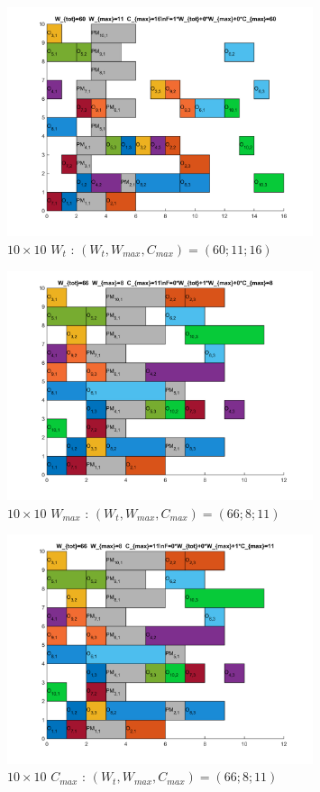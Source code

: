 \documentclass[10pt,a4paper]{scrartcl}
\begin{document}
\begin{figure}
  \centering
  \includegraphics[width=0.8\textwidth]{img/results10x10_Wtot.png}
  \caption{$10 \times 10$ $W_{t}$ : $(W_t, W_{max}, C_{max}) = (60; 11; 16)$}
\end{figure}
\begin{figure}
  \centering
  \includegraphics[width=0.8\textwidth]{img/results10x10_Wmax.png}
  \caption{$10 \times 10$ $W_{max}$ : $(W_t, W_{max}, C_{max}) = (66; 8; 11)$}
\end{figure}
\begin{figure}
  \centering
  \includegraphics[width=0.8\textwidth]{img/results10x10_Cmax.png}
  \caption{$10 \times 10$ $C_{max}$ : $(W_t, W_{max}, C_{max}) = (66; 8; 11)$}
\end{figure}
\end{document}

